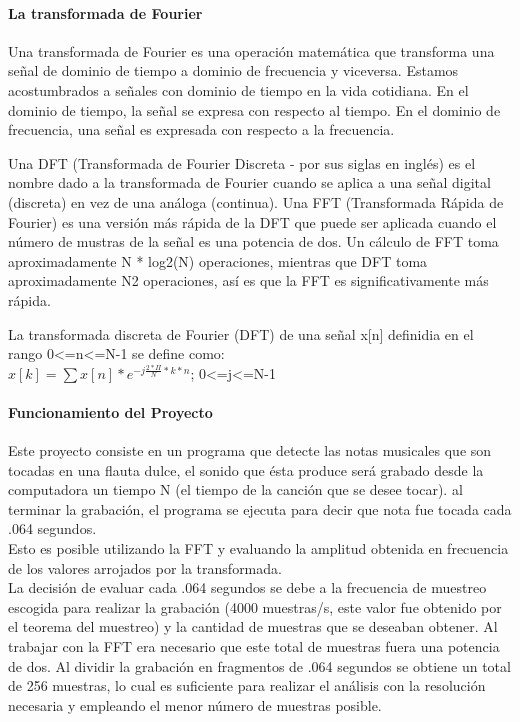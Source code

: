 \paragraph{La transformada de Fourier}

Una transformada de Fourier es una operación matemática que transforma
una señal de dominio de tiempo a dominio de frecuencia y viceversa.
Estamos acostumbrados a señales con dominio de tiempo en la vida cotidiana.
En el dominio de tiempo, la señal se expresa con respecto al tiempo.
En el dominio de frecuencia, una señal es expresada con respecto a
la frecuencia. 

Una DFT (Transformada de Fourier Discreta - por sus siglas en inglés)
es el nombre dado a la transformada de Fourier cuando se aplica a
una señal digital (discreta) en vez de una análoga (continua). Una
FFT (Transformada Rápida de Fourier) es una versión más rápida de
la DFT que puede ser aplicada cuando el número de mustras de la señal
es una potencia de dos. Un cálculo de FFT toma aproximadamente N {*}
log2(N) operaciones, mientras que DFT toma aproximadamente N2 operaciones,
así es que la FFT es significativamente más rápida. 

La transformada discreta de Fourier (DFT) de una señal x{[}n{]} definidia
en el rango 0\textless{}=n\textless{}=N-1 se define como:\\

$x[k]=\sum x[n]*e^{-j\frac{2*\Pi}{N}*k*n}$; 0\textless{}=j\textless{}=N-1\\

\paragraph{Funcionamiento del Proyecto}
Este proyecto consiste en un programa que detecte las notas musicales
que son tocadas en una flauta dulce, el sonido que ésta produce será
grabado desde la computadora un tiempo N (el tiempo de la canción
que se desee tocar). al terminar la grabación, el programa se ejecuta para decir que nota fue tocada cada .064 segundos.\\
Esto es posible utilizando la FFT y evaluando la amplitud obtenida en frecuencia de los valores arrojados por la transformada.\\ La decisión de evaluar cada .064 segundos se debe a la frecuencia de muestreo escogida para realizar la grabación (4000 muestras/s, este valor fue obtenido por el teorema del muestreo) y la cantidad de muestras que se deseaban obtener. Al trabajar con la FFT era necesario que este total de muestras fuera una potencia de dos. Al dividir la grabación en fragmentos de .064 segundos se obtiene un total de 256 muestras, lo cual es suficiente para realizar el análisis con la resolución necesaria y empleando el menor número de muestras posible.
